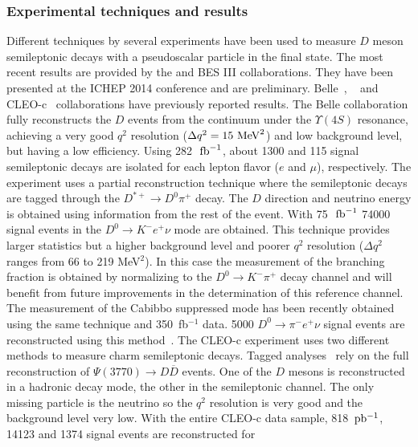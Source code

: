 \subsubsection{Experimental techniques and results}
 Different techniques by several experiments have been used to measure $D$ meson semileptonic decays with a 
pseudoscalar particle in the final state. The most recent results are provided by the \babar and BES III collaborations.
They have been presented at the ICHEP 2014 conference and are preliminary.  
Belle~\cite{Widhalm:2006wz}, \babar~\cite{Aubert:2007wg} and CLEO-c~\cite{Besson:2009uv,Dobbs:2007aa} 
collaborations have previously reported results. 
The Belle collaboration fully reconstructs the $D$ events from the continuum under the $\Upsilon(4S)$ resonance, 
achieving a very good $q^2$ resolution ($\Delta q^2 = 15 {\rm~MeV}^2$) and low background level, 
but having a low efficiency. Using 282~$\mbox{\,fb}^{-1}$, about 1300 and 115 signal semileptonic decays are 
isolated for each lepton flavor ($e$ and $\mu$), respectively. 
The \babar experiment uses a partial reconstruction technique where the semileptonic decays are tagged 
through the $ D^{\ast +}\to D^0\pi^+$ decay. 
The $D$ direction and neutrino energy is obtained using information from the rest of the event. 
With 75~$\mbox{\,fb}^{-1}$ 74000 signal events in the $D^0 \to {K}^- e^+ \nu$ mode are obtained. 
This technique provides larger statistics but a higher background level and poorer $q^2$ resolution ($\Delta q^2$ ranges from 66 to 219 MeV$^2$). In this case the measurement of the branching fraction is obtained by normalizing to the $D^0 \to K^- \pi^+$ decay channel and will benefit from future improvements in the determination of this reference channel. The measurement of the Cabibbo suppressed mode has been recently obtained 
using the same technique and 350~fb$^{-1}$ data. 5000 $D^0 \to {\pi}^- e^+ \nu$ signal events are reconstructed using this method~\cite{Lees:2014jka}.  
The CLEO-c experiment uses two different methods to measure charm semileptonic decays. 
Tagged analyses~\cite{Besson:2009uv} rely on the full reconstruction of $\Psi(3770)\to D {\overline D}$ events. One of the $D$ mesons is reconstructed in a hadronic decay mode, the other in the semileptonic channel. The only missing particle is the neutrino so the $q^2$ resolution is very good and the background level very low.   
With the entire CLEO-c data sample, 818 $\rm \,pb^{-1}$, 14123 and 1374 signal events are reconstructed for 
